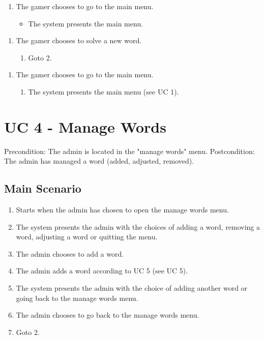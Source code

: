 \documentclass[12pt, letterpaper]{article}
\begin{document}
\begin{enumerate}[label=3.1.]
\begin{enumerate}[label=3.1 b]
\begin{enumerate}[label=3.1 b.\arabic*]
			\begin{enumerate}[label=3.1 b.3.]
				\item The gamer chooses to go to the main menu.
				\begin{itemize}
					\item The system presents the main menu. 
				\end{itemize}
			\end{enumerate}
				
		\end{enumerate}
	\end{enumerate}
\end{enumerate}
\begin{enumerate}[label=7.1.]
	\item The gamer chooses to solve a new word. 
	\begin{enumerate}[label=7.1.\arabic*]
		\item Goto 2.
	\end{enumerate}
\end{enumerate}
\begin{enumerate}[label=7.2.]
	\item The gamer chooses to go to the main menu. 
	\begin{enumerate}[label=7.2.\arabic*]
		\item The system presents the main menu (see UC 1).
	\end{enumerate}
\end{enumerate}

\section{UC 4 - Manage Words}
Precondition: The admin is located in the "manage words" menu.
\newline
Postcondition: The admin has managed a word (added, adjusted, removed).
\subsection{Main Scenario}
\begin{enumerate}
	\item Starts when the admin has chosen to open the manage words menu.
	\item The system presents the admin with the choices of adding a word, removing a word, adjusting a word or quitting the menu.
	\item The admin chooses to add a word.
	\item The admin adds a word according to UC 5 (see UC 5).
	\item The system presents the admin with the choice of adding another word or going back to the manage words menu.
	\item The admin chooses to go back to the manage words menu.
	\item Goto 2.
\end{enumerate}
\end{document}
